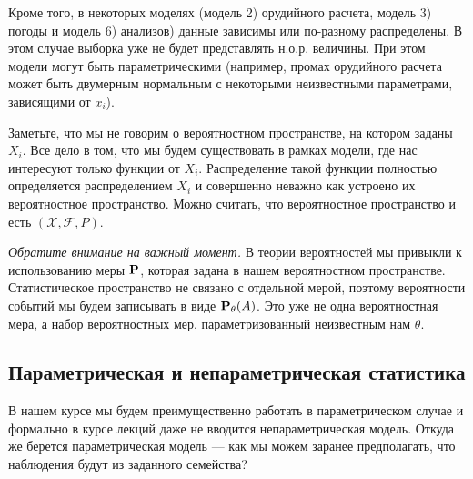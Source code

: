\documentclass[10 pt,russian]{article}
\begin{document}
Кроме того, в некоторых моделях (модель 2) орудийного расчета, модель 3) погоды и модель 6) анализов) данные зависимы или по-разному распределены. В этом случае выборка уже не будет представлять н.о.р. величины. При этом модели могут быть параметрическими (например, промах орудийного расчета может быть двумерным нормальным с некоторыми неизвестными параметрами, зависящими от $x_i$). 

Заметьте, что мы не говорим о вероятностном пространстве, на котором заданы $X_i$. Все дело в том, что мы будем существовать в рамках модели, где нас интересуют только функции от $X_i$. Распределение такой функции полностью определяется распределением $X_i$ и совершенно неважно как устроено их вероятностное пространство. Можно считать, что вероятностное пространство и есть $(\mathcal{X},\mathcal{F},P)$.

{\it Обратите внимание на важный момент.} В теории вероятностей мы привыкли к использованию меры ${\bf P}$, которая задана в нашем вероятностном пространстве. Статистическое пространство не связано с отдельной мерой, поэтому вероятности событий мы будем записывать в виде ${\bf P}_{\theta}(A)$. Это уже не одна вероятностная мера, а набор вероятностных мер, параметризованный неизвестным нам $\theta$.
\subsection{Параметрическая и непараметрическая статистика}
В нашем курсе мы будем преимущественно работать в параметрическом случае и формально в курсе лекций даже не вводится непараметрическая модель. Откуда же берется параметрическая модель --- как мы можем заранее предполагать, что наблюдения будут из заданного семейства?
\end{document}
